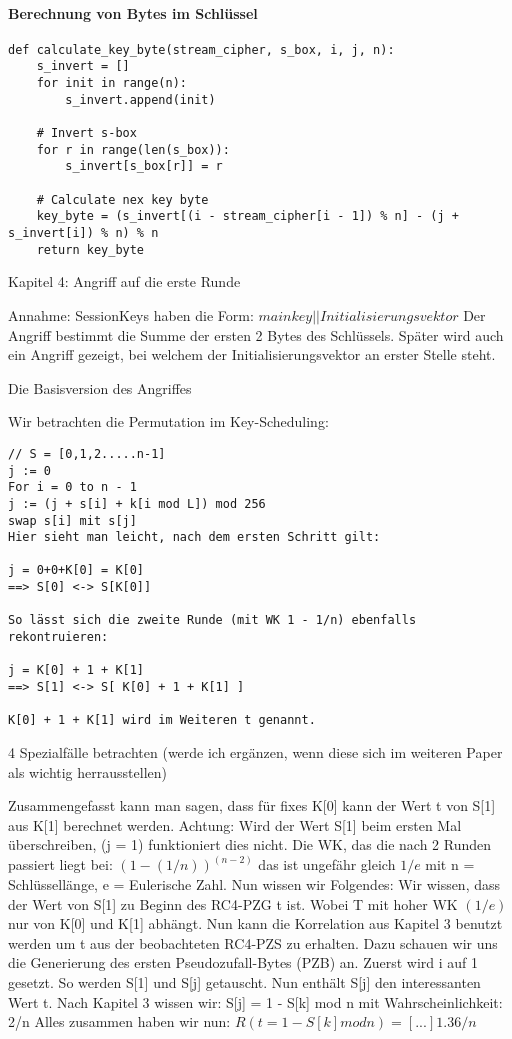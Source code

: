 \documentclass[10pt,a4paper]{article}
\begin{document}
\paragraph{Berechnung von Bytes im Schlüssel} 
\begin{lstlisting}
def calculate_key_byte(stream_cipher, s_box, i, j, n):
    s_invert = []
    for init in range(n):
        s_invert.append(init)

    # Invert s-box
    for r in range(len(s_box)):
        s_invert[s_box[r]] = r

    # Calculate nex key byte
    key_byte = (s_invert[(i - stream_cipher[i - 1]) % n] - (j + s_invert[i]) % n) % n
    return key_byte
\end{lstlisting}

Kapitel 4: Angriff auf die erste Runde

Annahme: SessionKeys haben die Form: $main key || Initialisierungsvektor$
Der Angriff bestimmt die Summe der ersten 2 Bytes des Schlüssels. Später wird auch ein Angriff gezeigt, bei welchem der Initialisierungsvektor an erster Stelle steht.

Die Basisversion des Angriffes

Wir betrachten die Permutation im Key-Scheduling:

\begin{verbatim}
// S = [0,1,2.....n-1]
j := 0
For i = 0 to n - 1
j := (j + s[i] + k[i mod L]) mod 256
swap s[i] mit s[j]
Hier sieht man leicht, nach dem ersten Schritt gilt:

j = 0+0+K[0] = K[0]  
==> S[0] <-> S[K[0]] 
 
So lässt sich die zweite Runde (mit WK 1 - 1/n) ebenfalls rekontruieren:

j = K[0] + 1 + K[1]  
==> S[1] <-> S[ K[0] + 1 + K[1] ]  

K[0] + 1 + K[1] wird im Weiteren t genannt.

\end{verbatim}

4 Spezialfälle betrachten (werde ich ergänzen, wenn diese sich im weiteren Paper als wichtig herrausstellen)

Zusammengefasst kann man sagen, dass für fixes K[0] kann der Wert t von S[1] aus K[1] berechnet werden. Achtung: Wird der Wert S[1] beim ersten Mal überschreiben, (j = 1) funktioniert dies nicht. Die WK, das die nach 2 Runden passiert liegt bei:
$(1- (1/n))^(n-2)$ das ist ungefähr gleich $1/e$ mit n = Schlüssellänge, e = Eulerische Zahl. Nun wissen wir Folgendes: Wir wissen, dass der Wert von S[1] zu Beginn des RC4-PZG t ist. Wobei T mit hoher WK $(1/e)$ nur von K[0] und K[1] abhängt. Nun kann die Korrelation aus Kapitel 3 benutzt werden um t aus der beobachteten RC4-PZS zu erhalten. Dazu schauen wir uns die Generierung des ersten Pseudozufall-Bytes (PZB) an. Zuerst wird i auf 1 gesetzt. So werden S[1] und S[j] getauscht. Nun enthält S[j] den interessanten Wert t. Nach Kapitel 3 wissen wir: S[j] = 1 - S[k] mod n mit Wahrscheinlichkeit: 2/n Alles zusammen haben wir nun: $R( t = 1 - S[k] mod n) = [...] 1.36 /n$
\end{document}
